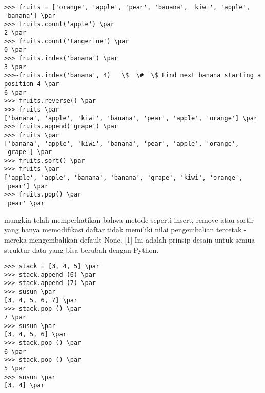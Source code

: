 \begin{verbatim}
>>> fruits = ['orange', 'apple', 'pear', 'banana', 'kiwi', 'apple', 'banana'] \par
>>> fruits.count('apple') \par
2 \par
>>> fruits.count('tangerine') \par
0 \par
>>> fruits.index('banana') \par
3 \par
>>>~fruits.index('banana', 4)   \$  \#  \$ Find next banana starting a position 4 \par
6 \par
>>> fruits.reverse() \par
>>> fruits \par
['banana', 'apple', 'kiwi', 'banana', 'pear', 'apple', 'orange'] \par
>>> fruits.append('grape') \par
>>> fruits \par
['banana', 'apple', 'kiwi', 'banana', 'pear', 'apple', 'orange', 'grape'] \par
>>> fruits.sort() \par
>>> fruits \par
['apple', 'apple', 'banana', 'banana', 'grape', 'kiwi', 'orange', 'pear'] \par
>>> fruits.pop() \par
'pear' \par
\end{verbatim}
\vspace{12pt}
mungkin telah memperhatikan bahwa metode seperti insert, remove atau sortir yang hanya memodifikasi daftar tidak memiliki nilai pengembalian tercetak - mereka mengembalikan default None. [1] Ini adalah prinsip desain untuk semua struktur data yang bisa berubah dengan Python. \par
\vspace{12pt}
\begin{verbatim}
>>> stack = [3, 4, 5] \par
>>> stack.append (6) \par
>>> stack.append (7) \par
>>> susun \par
[3, 4, 5, 6, 7] \par
>>> stack.pop () \par
7 \par
>>> susun \par
[3, 4, 5, 6] \par
>>> stack.pop () \par
6 \par
>>> stack.pop () \par
5 \par
>>> susun \par
[3, 4] \par
\end{verbatim}
\vspace{12pt}
